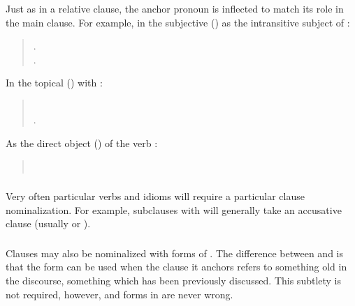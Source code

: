 \subsubsection{} Just as in a relative clause, the anchor pronoun is
inflected to match its role in the main clause.  For example, in the
subjective () as the intransitive subject of :

\begin{quotation}
\noindent{}.\\
\indent{}.
\end{quotation}

\noindent In the topical () with :
\begin{quotation}
\noindent{}\\
\indent{}.
\end{quotation}

\noindent As the direct object () of the verb :
\begin{quotation}
\noindent{}\\
\indent{}
\end{quotation}

\subsubsection{} Very often particular verbs and idioms will require a
particular clause nominalization.  For example, subclauses with
  will generally take an accusative clause (usually
 or ).

\subsubsection{} Clauses may also be nominalized with forms of
.  The difference between  and  is that the
 form can be used when the clause it anchors refers to
something old in the discourse, something which has been previously
discussed.  This subtlety is not required, however, and forms in
 are never wrong. 

